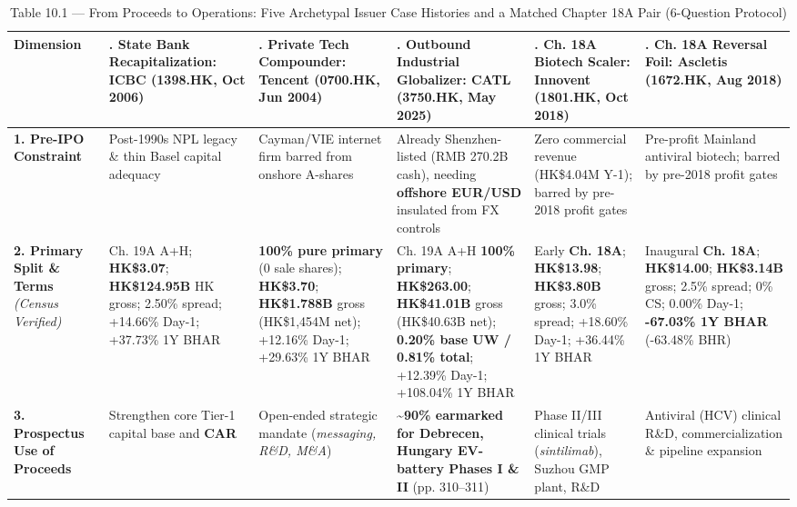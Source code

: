 \documentclass[11pt,letterpaper]{article}
\begin{document}
\begin{table}[!htbp]
\centering
\caption*{Table 10.1 — From Proceeds to Operations: Five Archetypal Issuer Case Histories and a Matched Chapter 18A Pair (6-Question Protocol)}
\begin{adjustbox}{max width=\textwidth,max totalheight=0.79\textheight}
\begin{minipage}{\textwidth}\centering
\footnotesize
\setlength{\tabcolsep}{3.5pt}
\renewcommand{\arraystretch}{1.18}
\begin{adjustbox}{max width=\textwidth}
\begin{tabular}{>{\raggedright\arraybackslash}p{2.26cm}>{\raggedright\arraybackslash}p{2.71cm}>{\raggedright\arraybackslash}p{2.71cm}>{\raggedright\arraybackslash}p{2.71cm}>{\raggedright\arraybackslash}p{2.71cm}>{\raggedright\arraybackslash}p{2.71cm}}
\toprule
Dimension & 1. State Bank Recapitalization: \textbf{ICBC (1398.HK, Oct 2006)} & 2. Private Tech Compounder: \textbf{Tencent (0700.HK, Jun 2004)} & 3. Outbound Industrial Globalizer: \textbf{CATL (3750.HK, May 2025)} & 4. Ch. 18A Biotech Scaler: \textbf{Innovent (1801.HK, Oct 2018)} & 5. Ch. 18A Reversal Foil: \textbf{Ascletis (1672.HK, Aug 2018)} \\
\midrule
\textbf{1. Pre-IPO Constraint} & Post-1990s NPL legacy \& thin Basel capital adequacy & Cayman/VIE internet firm barred from onshore A-shares & Already Shenzhen-listed (RMB 270.2B cash), needing \textbf{offshore EUR/USD} insulated from FX controls & Zero commercial revenue (HK\$4.04M Y-1); barred by pre-2018 profit gates & Pre-profit Mainland antiviral biotech; barred by pre-2018 profit gates \\
\textbf{2. Primary Split \& Terms} \textit{(Census Verified)} & Ch. 19A A+H; \textbf{HK\$3.07}; \textbf{HK\$124.95B} HK gross; 2.50\% spread; +14.66\% Day-1; +37.73\% 1Y BHAR & \textbf{100\% pure primary} (0 sale shares); \textbf{HK\$3.70}; \textbf{HK\$1.788B} gross (HK\$1,454M net); +12.16\% Day-1; +29.63\% 1Y BHAR & Ch. 19A A+H \textbf{100\% primary}; \textbf{HK\$263.00}; \textbf{HK\$41.01B} gross (HK\$40.63B net); \textbf{0.20\% base UW / 0.81\% total}; +12.39\% Day-1; +108.04\% 1Y BHAR & Early \textbf{Ch. 18A}; \textbf{HK\$13.98}; \textbf{HK\$3.80B} gross; 3.0\% spread; +18.60\% Day-1; +36.44\% 1Y BHAR & Inaugural \textbf{Ch. 18A}; \textbf{HK\$14.00}; \textbf{HK\$3.14B} gross; 2.5\% spread; 0\% CS; 0.00\% Day-1; \textbf{-67.03\% 1Y BHAR} (-63.48\% BHR) \\
\textbf{3. Prospectus Use of Proceeds} & Strengthen core Tier-1 capital base and \textbf{CAR} & Open-ended strategic mandate (\textit{messaging, R\&D, M\&A}) & \textbf{\textasciitilde{}90\% earmarked for Debrecen, Hungary EV-battery Phases I \& II} (pp. 310–311) & Phase II/III clinical trials (\textit{sintilimab}), Suzhou GMP plant, R\&D & Antiviral (HCV) clinical R\&D, commercialization \& pipeline expansion \\

\end{tabular}
\end{adjustbox}
\end{minipage}
\end{adjustbox}
\end{table}
\end{document}
